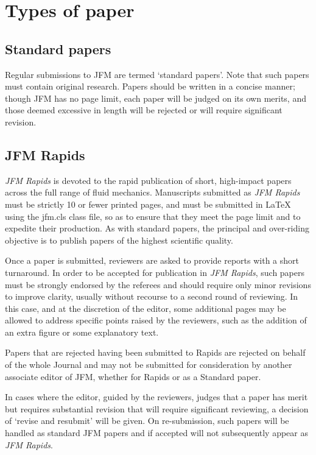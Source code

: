 \documentclass[lineno]{jfm}
\begin{document}
\section{Types of paper}\label{sec:types_paper}
\subsection{Standard papers}
 Regular submissions to JFM are termed `standard papers'. Note that such papers must contain original research. Papers should be written in a concise manner; though JFM has no page limit, each paper will be judged on its own merits, and those deemed excessive in length will be rejected or will require significant revision.
\subsection{JFM Rapids}
 {\it JFM Rapids} is devoted to the rapid publication of short, high-impact papers across the full range of fluid mechanics. Manuscripts submitted as {\it JFM Rapids}  must be strictly 10 or fewer printed pages, and must be submitted in {\LaTeX} using the jfm.cls class file, so as to ensure that they meet the page limit and to expedite their production.  As with standard papers, the principal and over-riding objective is to publish papers of the highest scientific quality.

Once a paper is submitted, reviewers are asked to provide reports with a short turnaround.  In order to be accepted for publication in {\it JFM Rapids}, such papers must be strongly endorsed by the referees and should require only minor revisions to improve clarity, usually without recourse to a second round of reviewing. In this case, and at the discretion of the editor, some additional pages may be allowed to address specific points raised by the reviewers, such as the addition of an extra figure or some explanatory text.

Papers that are rejected having been submitted to Rapids are rejected on behalf of the whole Journal and may not be submitted for consideration by another associate editor of JFM, whether for Rapids or as a Standard paper.

In cases where the editor, guided by the reviewers, judges that a paper has merit but requires substantial revision that will require significant reviewing, a decision of `revise and resubmit' will be given. On re-submission, such papers will be handled as standard JFM papers and if accepted will not subsequently appear as {\it JFM Rapids}.
\end{document}
